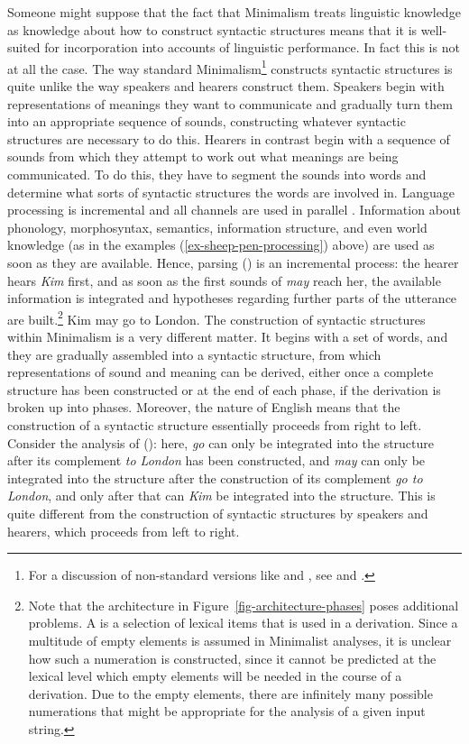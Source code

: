\documentclass[output=paper
                ,modfonts
                ,nonflat
	        ,collection
	        ,collectionchapter
	        ,collectiontoclongg
 	        ,biblatex
                ,babelshorthands
                ,newtxmath
                ,draftmode
                ,colorlinks, citecolor=brown
]{./langsci/langscibook}
\begin{document}
Someone might suppose that the fact that Minimalism treats linguistic knowledge as knowledge about
how to construct syntactic structures means that it is well-suited for incorporation into accounts
of linguistic performance. In fact this is not at all the case. The way standard
Minimalism\footnote{%
For a discussion of non-standard versions like \citet{Phillips2003a} and \citet{Chesi2015a-u}, see
 and .%
} constructs syntactic structures is quite unlike the way speakers and hearers construct them. Speakers begin
with representations of meanings they want to communicate and gradually turn them into an
appropriate sequence of sounds, constructing whatever syntactic structures are necessary to do
this. Hearers in contrast begin with a sequence of sounds from which they attempt to work out what
meanings are being communicated. To do this, they have to segment the sounds into words and
determine what sorts of syntactic structures the words are involved in. 
Language processing is incremental and all channels are used in
parallel \citep{Marslen-Wilson75a,TSKES95a,TSKES96a}. Information about phonology, morphosyntax, semantics, information structure, and even
world knowledge (as in the examples (\ref{ex-sheep-pen-processing}) above) are used as soon as they
are available. Hence, parsing () is an incremental process: the hearer hears \emph{Kim} first,
and as soon as the first sounds of \emph{may} reach her, the available information is integrated
and hypotheses regarding further parts of the utterance are built.\footnote{
  Note that the architecture in Figure~\ref{fig-architecture-phases} poses additional problems. A
  \emph{} is a selection of lexical items that is used in a derivation. Since a multitude
  of empty elements is assumed in Minimalist analyses, it is unclear how such a numeration is
  constructed, since it cannot be predicted at the lexical level which empty elements will be needed in the course of a
  derivation. Due to the empty elements, there are infinitely many possible numerations that might be
  appropriate for the analysis of a given input string.%
}
\ea
Kim may go to London.
\z
The construction of syntactic structures within Minimalism is a very different matter. It begins with a set of words,
and they are gradually assembled into a syntactic structure, from which representations of sound and
meaning can be derived, either once a complete structure has been constructed or at the end of each
phase, if the derivation is broken up into phases. Moreover, the nature of English means that the
construction of a syntactic structure essentially proceeds from right to left. Consider the
analysis of (): here, \emph{go} can only be integrated into the structure after its complement \emph{to London} has been
constructed, and \emph{may} can only be integrated into the structure after the construction of its
complement \emph{go to London}, and only after that can \emph{Kim} be integrated into the
structure. This is quite different from the construction of syntactic structures by speakers and
hearers, which proceeds from left to right.
\end{document}
